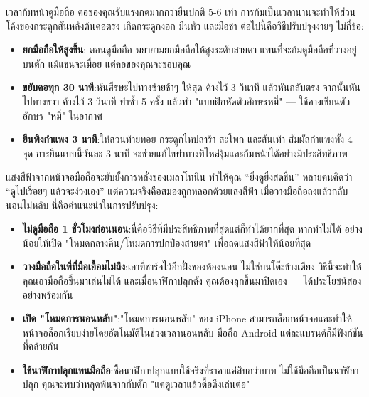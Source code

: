 
เวลาก้มหน้าดูมือถือ คอของคุณรับแรงกดมากกว่ายืนปกติ 5-6 เท่า การก้มเป็นเวลานานจะทำให้ส่วนโค้งของกระดูกสันหลังต้นคอตรง เกิดกระดูกงอก มึนหัว และมือชา ต่อไปนี้คือวิธีปรับปรุงง่ายๆ ไม่กี่ข้อ:

\begin{itemize}
  \item \textbf{ยกมือถือให้สูงขึ้น}: ตอนดูมือถือ พยายามยกมือถือให้สูงระดับสายตา แทนที่จะก้มดูมือถือที่วางอยู่บนตัก แม้แขนจะเมื่อย แต่คอของคุณจะขอบคุณ
  \item \textbf{ขยับคอทุก 30 นาที}:หันศีรษะไปทางซ้ายช้าๆ ให้สุด ค้างไว้ 3 วินาที แล้วหันกลับตรง จากนั้นหันไปทางขวา ค้างไว้ 3 วินาที ทำซ้ำ 5 ครั้ง แล้วทำ "แบบฝึกหัดตัวอักษรหมี่" — ใช้คางเขียนตัวอักษร "หมี่" ในอากาศ
  \item \textbf{ยืนพิงกำแพง 3 นาที}:ให้ส่วนท้ายทอย กระดูกไหปลาร้า สะโพก และส้นเท้า สัมผัสกำแพงทั้ง 4 จุด การยืนแบบนี้วันละ 3 นาที จะช่วยแก้ไขท่าทางที่ไหล่งุ้มและก้มหน้าได้อย่างมีประสิทธิภาพ
\end{itemize}


แสงสีฟ้าจากหน้าจอมือถือจะยับยั้งการหลั่งของเมลาโทนิน ทำให้คุณ “ยิ่งดูยิ่งสดชื่น” หลายคนคิดว่า “ดูไปเรื่อยๆ แล้วจะง่วงเอง” แต่ความจริงคือสมองถูกหลอกด้วยแสงสีฟ้า เมื่อวางมือถือลงแล้วกลับนอนไม่หลับ นี่คือคำแนะนำในการปรับปรุง:

\begin{itemize}
  \item \textbf{ไม่ดูมือถือ 1 ชั่วโมงก่อนนอน}:นี่คือวิธีที่มีประสิทธิภาพที่สุดแต่ก็ทำได้ยากที่สุด หากทำไม่ได้ อย่างน้อยให้เปิด "โหมดกลางคืน/โหมดการปกป้องสายตา" เพื่อลดแสงสีฟ้าให้น้อยที่สุด
  \item \textbf{วางมือถือในที่ที่มือเอื้อมไม่ถึง}:เอาที่ชาร์จไว้อีกฝั่งของห้องนอน ไม่ใช่บนโต๊ะข้างเตียง วิธีนี้จะทำให้คุณเอามือถือขึ้นมาเล่นไม่ได้ และเมื่อนาฬิกาปลุกดัง คุณต้องลุกขึ้นมาปิดเอง — ได้ประโยชน์สองอย่างพร้อมกัน
  \item \textbf{เปิด "โหมดการนอนหลับ"}:"โหมดการนอนหลับ" ของ iPhone สามารถล็อกหน้าจอและทำให้หน้าจอล็อกเรียบง่ายโดยอัตโนมัติในช่วงเวลานอนหลับ มือถือ Android แต่ละแบรนด์ก็มีฟังก์ชันที่คล้ายกัน
  \item \textbf{ใช้นาฬิกาปลุกแทนมือถือ}:ซื้อนาฬิกาปลุกแบบใช้จริงที่ราคาแค่สิบกว่าบาท ไม่ใช้มือถือเป็นนาฬิกาปลุก คุณจะพบว่าหลุดพ้นจากกับดัก "แค่ดูเวลาแล้วดื้อดึงเล่นต่อ"
\end{itemize}

